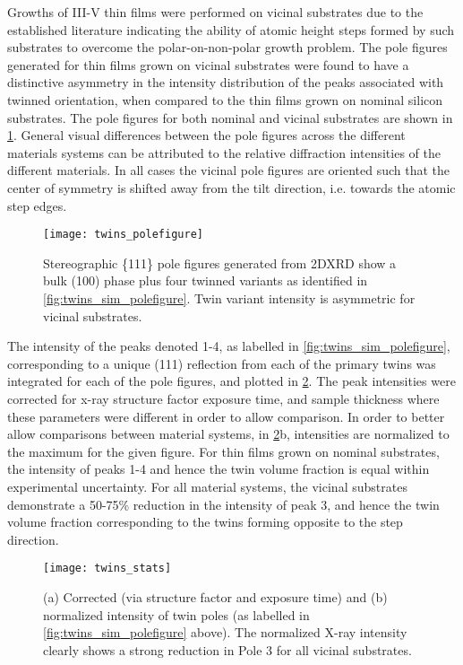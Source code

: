 Growths of III-V thin films were performed on vicinal substrates due to the established 
literature indicating the ability of atomic height steps formed by such substrates to 
overcome the polar-on-non-polar growth problem\cite{Kroemer1987}. The pole figures 
generated for thin films grown on vicinal substrates were found to have a distinctive 
asymmetry in the intensity distribution of the peaks associated with twinned orientation, 
when compared to the thin films grown on nominal silicon substrates. The pole figures for 
both nominal and vicinal substrates are shown in \cref{fig:twins_polefigure}. 
General visual differences between the pole figures across the different materials systems can be attributed to the relative diffraction intensities of the different materials.
In all cases the vicinal pole figures are oriented such that the center of symmetry is shifted away from the tilt direction, i.e. towards the atomic step edges.

\begin{figure}
    \centering
    \texttt{[image: twins\_polefigure]}
    \caption{Stereographic \{111\} pole figures generated from 2DXRD show a bulk (100) 
    phase plus four twinned variants as identified in \cref{fig:twins_sim_polefigure}. 
    Twin variant intensity is asymmetric for vicinal 
    substrates.\label{fig:twins_polefigure}}
\end{figure}

The intensity of the peaks denoted 1-4, as labelled in \cref{fig:twins_sim_polefigure}, corresponding to a unique (111) reflection from each of the primary twins was integrated for each of the pole figures, and plotted in \cref{fig:twins_stats}.
The peak intensities were corrected for x-ray structure factor exposure time, and sample thickness where these parameters were different in order to allow comparison.
In order to better allow comparisons between material systems, in \cref{fig:twins_stats}b, intensities are normalized to the maximum for the given figure.
For thin films grown on nominal substrates, the intensity of peaks 1-4 and hence the twin volume fraction is equal within experimental uncertainty.
For all material systems, the vicinal substrates demonstrate a 50-75\% reduction in the intensity of peak 3, and hence the twin volume fraction corresponding to the twins forming opposite to the step direction.

\begin{figure}
    \centering
    \texttt{[image: twins\_stats]}
    \caption{(a) Corrected (via structure factor and exposure time) and (b) normalized intensity of twin poles (as labelled in \cref{fig:twins_sim_polefigure} above). The normalized X-ray intensity clearly shows a strong reduction in Pole 3 for all vicinal substrates.\label{fig:twins_stats}}
\end{figure}

